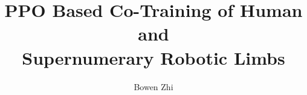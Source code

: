 \documentclass[a4paper, twoside]{report}
\title{PPO Based Co-Training of Human and \\[0.4cm] Supernumerary Robotic Limbs}
\author{Bowen Zhi}
\begin{document}








\renewcommand{\bibname}{Reference}

\end{document}
